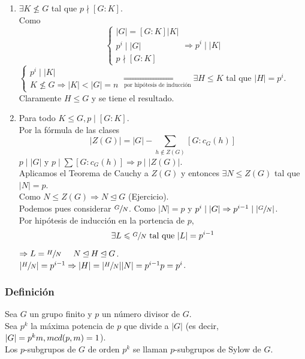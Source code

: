 \documentclass[11pt,a4paper]{article}
\begin{document}
\begin{enumerate}[label = Caso \arabic*]
\item $\exists K \nleq G$ tal que $p \nmid [G:K]$. \\
Como
$$\begin{cases}
|G| = [G:K] |K| \\
p^{i} \mid |G| \\
p \nmid [G:K]
\end{cases}
\Rightarrow p^{i} \mid |K|$$
$\begin{cases}
p^{i} \mid |K| \\
K \nleq G \Rightarrow |K| < |G| = n
\end{cases}
\underset{\text{por hipótesis de inducción}}{\Rightarrow} \exists H \leqslant K$ tal que $|H| = p^{i}$. Claramente $H \leqslant G$ y se tiene el resultado.
\item Para todo $K \leqslant G, p \mid [G:K]$. \\
Por la fórmula de las clases
$$|Z(G)| = |G| - \sum_{h \notin Z(G)} [G: c_{G}(h)]$$
$p \mid |G|$ y $p \mid \sum	[G:c_{G}(h)] \Rightarrow p \mid |Z(G)|$. \\
Aplicamos el Teorema de Cauchy a $Z(G)$ y entonces $\exists N \leqslant Z(G)$ tal que $|N| = p$. \\
Como $N \leqslant Z(G) \Rightarrow N \unlhd G$ (Ejercicio). \\
Podemos pues considerar $\sfrac{G}{N}$. Como $|N| = p$ y $p^{i} \mid |G| \Rightarrow p^{i-1} \mid |\sfrac{G}{N}|$. \\
Por hipótesis de inducción en la portencia de $p$,
$$\exists L \leqslant \sfrac{G}{N} \text{ tal que } |L| = p^{i-1}$$
$\Rightarrow L = \sfrac{H}{N} \hspace{0.5cm} N \unlhd H \unlhd G$. \\
$|\sfrac{H}{N}| = p^{i-1} \Rightarrow |H| = |\sfrac{H}{N}||N| = p^{i-1}p = p^{i}$.
\end{enumerate}

\subsubsection*{Definición}

Sea $G$ un grupo finito y $p$ un número divisor de $G$. \\
Sea $p^{k}$ la máxima potencia de $p$ que divide a $|G|$ (es decir, $|G| = p^{k}m, \\ mcd(p,m) = 1$). \\
Los $p$-subgrupos de $G$ de orden $p^{k}$ se llaman $p$-subgrupos de Sylow de $G$.
\end{document}
